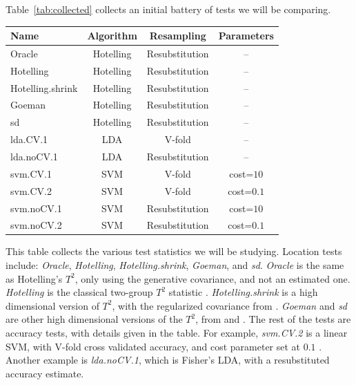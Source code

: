 \documentclass[12pt,a4paper]{article}
\begin{document}
Table~\ref{tab:collected} collects an initial battery of tests we will be comparing. 
\begin{tcolorbox}
\centering
\begin{tabular}{l|c|c|c}
Name & Algorithm & Resampling & Parameters\\ 
\hline
\hline
Oracle & Hotelling & Resubstitution & -- \\ 
Hotelling & Hotelling & Resubstitution & -- \\ 
Hotelling.shrink & Hotelling & Resubstitution & -- \\ 
Goeman & Hotelling & Resubstitution & -- \\ 
sd & Hotelling & Resubstitution & -- \\ 
lda.CV.1 	& LDA & V-fold 			&  -- \\ 
lda.noCV.1 	& LDA & Resubstitution 	&  --\\ 
svm.CV.1 	& SVM & V-fold 		    & cost=$10$ \\ 
svm.CV.2 	& SVM & V-fold 		    & cost=$0.1$ \\ 
svm.noCV.1 	& SVM & Resubstitution  & cost=$10$ \\ 
svm.noCV.2 	& SVM & Resubstitution  & cost=$0.1$ \\ 
\end{tabular} 
\captionsetup{type=table}
\caption{\footnotesize
This table collects the various test statistics we will be studying. 
Location tests include: \textit{Oracle}, \textit{Hotelling}, \textit{Hotelling.shrink}, \textit{Goeman}, and \textit{sd}.
\textit{Oracle} is the same as Hotelling's $T^2$, only using the generative covariance, and not an estimated one.
\textit{Hotelling} is the classical two-group $T^2$ statistic \citep{anderson_introduction_2003}. 
\textit{Hotelling.shrink} is a high dimensional version of $T^2$, with the regularized covariance from \citet{schafer_shrinkage_2005}. 
\textit{Goeman} and \textit{sd} are other high dimensional versions of the $T^2$, from \cite{goeman2006testing} and \cite{srivastava_testing_2013}.
The rest of the tests are accuracy tests, with details given in the table. 
For example, \textit{svm.CV.2} is a linear SVM, with V-fold cross validated accuracy, and cost parameter set at $0.1$ \citep{meyer_e1071:_2015}.
Another example is \textit{lda.noCV.1}, which is Fisher's LDA, with a resubstituted accuracy estimate.}
\label{tab:collected}
\end{tcolorbox}






\end{document}
